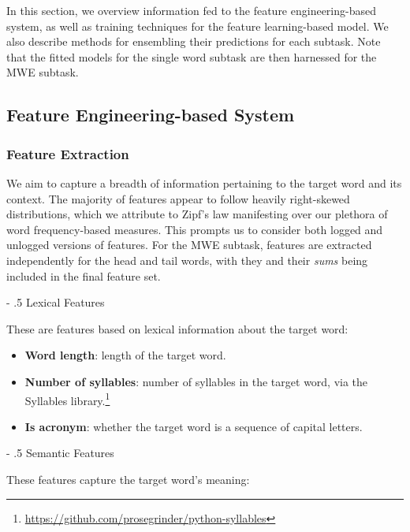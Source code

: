 \documentclass[11pt,a4paper]{article}
\makeatletter
\renewcommand\paragraph{%
    \@startsection{paragraph}{4}{0mm}%
        {-\baselineskip}%
        {.5\baselineskip}%
        {\normalfont\normalsize\bfseries}}
\makeatother
\begin{document}
In this section, we overview information fed to the feature engineering-based system, as well as training techniques for the feature learning-based model. We also describe methods for ensembling their predictions for each subtask. Note that the fitted models for the single word subtask are then harnessed for the MWE subtask.

\subsection{Feature Engineering-based System}

\subsubsection{Feature Extraction}

We aim to capture a breadth of information pertaining to the target word and its context. The majority of features appear to follow heavily right-skewed distributions, which we attribute to Zipf's law manifesting over our plethora of word frequency-based measures. This prompts us to consider both logged and unlogged versions of features. For the MWE subtask, features are extracted independently for the head and tail words, with they and their \textit{sums} being included in the final feature set.

\paragraph{Lexical Features}

These are features based on lexical information about the target word:

\begin{itemize}
  \item \textbf{Word length}: length of the target word.
  \item \textbf{Number of syllables}: number of syllables in the target word, via the Syllables library.\footnote{\url{https://github.com/prosegrinder/python-syllables}}
  \item \textbf{Is acronym}: whether the target word is a sequence of capital letters.
\end{itemize}
  
\paragraph{Semantic Features}

These features capture the target word's meaning:
\end{document}
